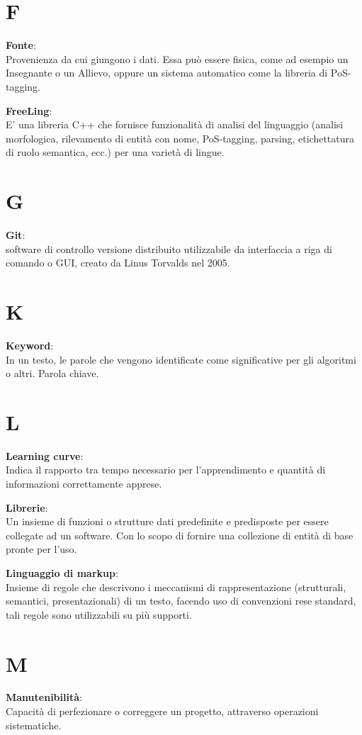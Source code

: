 \documentclass[a4paper, oneside, openany, dvipsnames, table]{article}
\begin{document}
\newpage
\section{F}
\textbf{Fonte}:\\	Provenienza da cui giungono i dati. Essa può essere fisica, come ad esempio un Insegnante o un Allievo, oppure un sistema automatico come la libreria di PoS-tagging.

\textbf{FreeLing}:\\	E' una libreria C++ che fornisce funzionalità di analisi del linguaggio
(analisi morfologica, rilevamento di entità con nome, PoS-tagging, parsing, etichettatura di ruolo semantica, ecc.) per una varietà di lingue.


\newpage
\section{G}
\textbf{Git}:\\	 software di controllo versione distribuito utilizzabile da interfaccia a riga di comando o GUI, creato da Linus Torvalds nel 2005.

\newpage
\section{K}
\textbf{Keyword}:\\	In un testo, le parole che vengono identificate come significative per gli algoritmi o altri. Parola chiave.


\newpage
\section{L}
\textbf{Learning curve}:\\ Indica il rapporto tra tempo necessario per l'apprendimento e quantità di informazioni correttamente apprese.

\textbf{Librerie}:\\	Un insieme di funzioni o strutture dati predefinite e predisposte per essere collegate ad un software. Con lo scopo di fornire una collezione di entità di base pronte per l'uso.

\textbf{Linguaggio di markup}:\\	 Insieme di regole che descrivono i meccanismi di rappresentazione (strutturali, semantici, presentazionali) di un testo, facendo uso di convenzioni rese standard, tali regole sono utilizzabili su più supporti.

\newpage
\section{M}
\textbf{Manutenibilità}:\\	Capacità di perfezionare o correggere un progetto, attraverso operazioni sistematiche.
\end{document}
